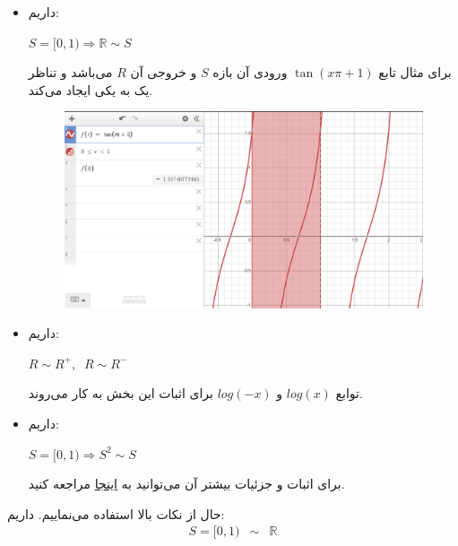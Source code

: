 \begin{enumerate}
\begin{itemize}
\begin{figure} [H]
        \end{figure}
        \item 
        داریم:
        \begin{center}
            $S=[0,1) \Longrightarrow \mathbb{R} \sim S$\\[0.1in]
        \end{center}
        برای مثال تابع 
        $\tan(x\pi+1)$
        ورودی آن بازه $S$ و خروجی آن $R$ می‌باشد و تناظر یک به یکی ایجاد می‌کند.
        \begin{figure} [H]
        \centering
        \includegraphics[scale=0.47]{solution/6-3-2.png}
        \end{figure}
        \item 
        داریم:
        \begin{center}
            $R\sim R^+,\;\;R\sim R^-$\\[0.1in]
        \end{center}
        توابع 
        $log(x)$ و $log(-x)$
        برای اثبات این بخش به کار می‌روند.
        \\[0.1in]
        \item 
        داریم:
        \begin{center}
            $S=[0,1) \Longrightarrow S^2 \sim S$\\[0.1in]
        \end{center}
        برای اثبات و جزئیات بیشتر آن می‌توانید به 
        \href{https://math.stackexchange.com/questions/183361/examples-of-bijective-map-from-mathbbr3-rightarrow-mathbbr/183383#183383}{اینجا}
        مراجعه کنید.\newline \newline
    \end{itemize}
    حال از نکات بالا استفاده می‌نماییم. داریم:
        \begin{eqnarray*}
            S = [0, 1) &\sim& \mathbb{R}\\

\end{eqnarray*}
\end{enumerate}

